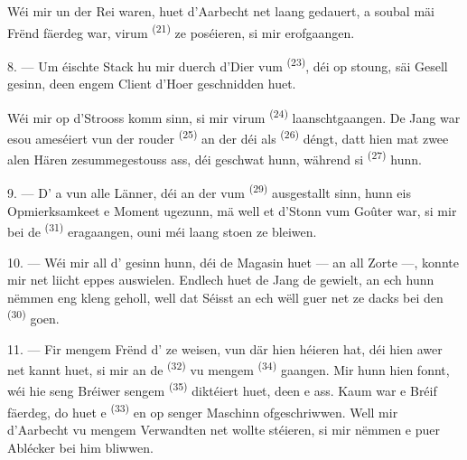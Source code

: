 Wéi mir un der Rei waren, huet d'Aarbecht net laang gedauert, a soubal mäi Frënd
fäerdeg war, virum  \textsuperscript{(21)} ze poséieren, si mir
erofgaangen.

8. --- Um éischte Stack hu mir duerch d'Dier vum 
\textsuperscript{(23)}, déi op stoung, säi Gesell gesinn, deen engem Client d'Hoer
geschnidden huet.

Wéi mir op d'Strooss komm sinn, si mir virum 
\textsuperscript{(24)} laanschtgaangen. De Jang war esou ameséiert vun der rouder
 \textsuperscript{(25)} an der  déi als
 \textsuperscript{(26)} déngt, datt hien mat zwee alen Hären
zesummegestouss ass, déi geschwat hunn, während si 
\textsuperscript{(27)} hunn.

\VUsaut{3.0mm}

9. --- D' a  vun alle Länner, déi an der
 vum  \textsuperscript{(29)} ausgestallt sinn, hunn
eis Opmierksamkeet e Moment ugezunn, mä well et d'Stonn vum Goûter war, si mir bei
de  \textsuperscript{(31)} eragaangen, ouni méi laang stoen ze
bleiwen.

10. --- Wéi mir all d' gesinn hunn, déi de Magasin huet ---
 an all Zorte  ---, konnte
mir net liicht eppes auswielen. Endlech huet de Jang de 
gewielt, an ech hunn nëmmen eng kleng  geholl, well dat Séisst
 an ech wëll guer net ze dacks bei den
 \textsuperscript{(30)} goen.

\VUsaut{3.0mm}

11. --- Fir mengem Frënd d' ze weisen, vun där hien héieren
hat, déi hien awer net kannt huet, si mir an de  \textsuperscript{(32)}
vu mengem  \textsuperscript{(34)} gaangen. Mir hunn hien fonnt, wéi hie
seng Bréiwer sengem  \textsuperscript{(35)} diktéiert huet, deen e
 ass. Kaum war e Bréif fäerdeg, do huet e
 \textsuperscript{(33)} en op senger Maschinn ofgeschriwwen.
Well mir d'Aarbecht vu mengem Verwandten net wollte stéieren, si mir nëmmen e puer
Ablécker bei him bliwwen.

